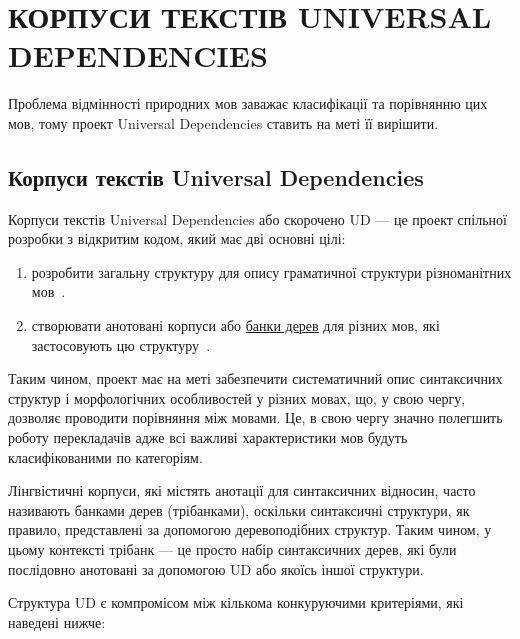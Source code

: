 \section{КОРПУСИ ТЕКСТІВ UNIVERSAL DEPENDENCIES}

Проблема відмінності природних мов заважає класифікації та порівнянню цих мов,
тому проект Universal Dependencies ставить на меті її вирішити.



\subsection{Корпуси текстів Universal Dependencies}
Корпуси текстів Universal Dependencies або скорочено UD — це проект спільної розробки
з відкритим кодом, який має дві основні цілі:

\begin{enumerate}
    \item розробити загальну структуру для опису граматичної структури різноманітних мов~\cite{bib1}.
    \item створювати анотовані корпуси або \hyperlink{term0}{банки дерев} для різних мов,
    які застосовують цю структуру~\cite{bib2}.
\end{enumerate}

Таким чином, проект має на меті забезпечити систематичний опис синтаксичних структур і
морфологічних особливостей у різних мовах, що, у свою чергу, дозволяє проводити порівняння
між мовами. Це, в свою чергу значно полегшить роботу перекладачів
адже всі важливі характеристики мов будуть класифікованими по категоріям.

Лінгвістичні корпуси, які містять анотації для синтаксичних відносин,
часто називають банками дерев (трібанками), оскільки синтаксичні структури, як правило,
представлені за допомогою деревоподібних структур. Таким чином, у цьому контексті трібанк —
це просто набір синтаксичних дерев, які були послідовно анотовані за допомогою UD
або якоїсь іншої структури.

Структура UD є компромісом між кількома конкуруючими критеріями, які наведені нижче:

